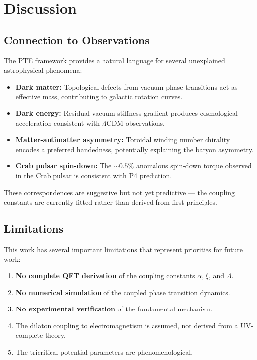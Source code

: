 \documentclass[12pt,a4paper]{article}
\begin{document}
\section{Discussion}
\label{sec:discussion}

\subsection{Connection to Observations}

The PTE framework provides a natural language for several unexplained astrophysical phenomena:

\begin{itemize}
    \item \textbf{Dark matter:} Topological defects from vacuum phase transitions act as effective mass, contributing to galactic rotation curves.
    \item \textbf{Dark energy:} Residual vacuum stiffness gradient produces cosmological acceleration consistent with $\Lambda$CDM observations.
    \item \textbf{Matter-antimatter asymmetry:} Toroidal winding number chirality encodes a preferred handedness, potentially explaining the baryon asymmetry.
    \item \textbf{Crab pulsar spin-down:} The $\sim 0.5\%$ anomalous spin-down torque observed in the Crab pulsar \cite{crab2024} is consistent with P4 prediction.
\end{itemize}

These correspondences are suggestive but not yet predictive --- the coupling constants are currently fitted rather than derived from first principles.

\subsection{Limitations}

This work has several important limitations that represent priorities for future work:

\begin{enumerate}
    \item \textbf{No complete QFT derivation} of the coupling constants $\alpha$, $\xi$, and $\Lambda$.
    \item \textbf{No numerical simulation} of the coupled phase transition dynamics.
    \item \textbf{No experimental verification} of the fundamental mechanism.
    \item The dilaton coupling to electromagnetism is assumed, not derived from a UV-complete theory.
    \item The tricritical potential parameters are phenomenological.
\end{enumerate}
\end{document}
